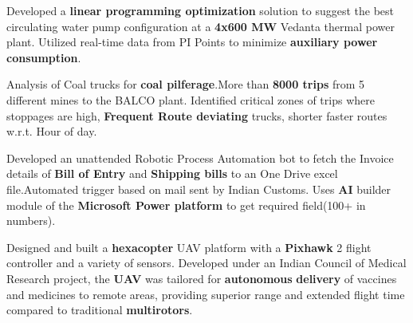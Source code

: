 \documentclass[]{deedy-resume-openfont}
\begin{document}
\begin{minipage}[t]{0.66\textwidth}


\sectionsep
{}
\vspace{\topsep} %
Developed a \textbf{linear programming optimization} solution to suggest the best circulating water pump configuration at a\textbf{ 4x600 MW} Vedanta thermal power plant. Utilized real-time data from PI Points to minimize \textbf{auxiliary power consumption}.
\sectionsep


\vspace{\topsep} %

Analysis of Coal trucks for \textbf{coal pilferage}.More than \textbf{8000 trips} from 5 different mines to the BALCO plant. Identified critical zones of trips where stoppages are high, \textbf{Frequent Route deviating} trucks, shorter faster routes w.r.t. Hour of day.

\sectionsep

\vspace{\topsep}
Developed an unattended Robotic Process Automation bot to fetch the Invoice details of \textbf{Bill of Entry} and \textbf{Shipping bills} to an One Drive excel file.Automated trigger based on mail sent by Indian Customs. Uses \textbf{AI} builder module of the \textbf{Microsoft Power platform} to get required field(100+ in numbers).\\
\sectionsep

\vspace{\topsep}
Designed and built a \textbf{hexacopter} UAV platform with a \textbf{Pixhawk} 2 flight controller and a variety of sensors. Developed under an Indian Council of Medical Research project, the \textbf{UAV} was tailored for \textbf{autonomous} \textbf{delivery} of vaccines and medicines to remote areas, providing superior range and extended flight time compared to traditional \textbf{multirotors}.
\sectionsep

\sectionsep
\end{minipage}
\headrule
\end{document}
